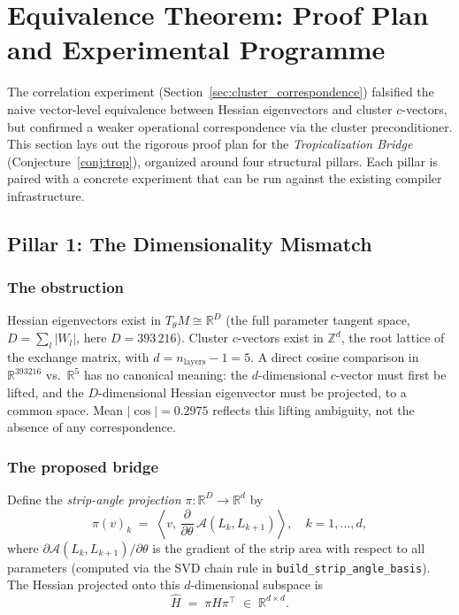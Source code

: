 \documentclass[11pt]{amsart}
\begin{document}
\section{Equivalence Theorem: Proof Plan and Experimental Programme}
\label{sec:equivalence_proof}

The correlation experiment (Section~\ref{sec:cluster_correspondence})
falsified the naive vector-level equivalence between Hessian eigenvectors
and cluster $c$-vectors, but confirmed a weaker operational correspondence
via the cluster preconditioner.
This section lays out the rigorous proof plan for the
\emph{Tropicalization Bridge} (Conjecture~\ref{conj:trop}),
organized around four structural pillars.
Each pillar is paired with a concrete experiment that can be run
against the existing compiler infrastructure.

\subsection{Pillar 1: The Dimensionality Mismatch}
\label{sec:pillar1}

\subsubsection*{The obstruction}

Hessian eigenvectors exist in $T_\theta M \cong \mathbb{R}^D$
(the full parameter tangent space, $D = \sum_l |W_l|$, here $D = 393\,216$).
Cluster $c$-vectors exist in $\mathbb{Z}^d$, the root lattice of the
exchange matrix, with $d = n_\mathrm{layers}-1 = 5$.
A direct cosine comparison in $\mathbb{R}^{393216}$ vs.\ $\mathbb{R}^5$
has no canonical meaning: the $d$-dimensional $c$-vector must first be
lifted, and the $D$-dimensional Hessian eigenvector must be projected,
to a common space.
Mean $|\cos| = 0.2975$ reflects this lifting ambiguity, not the
absence of any correspondence.

\subsubsection*{The proposed bridge}

Define the \emph{strip-angle projection} $\pi: \mathbb{R}^D \to \mathbb{R}^d$ by
\[
  \pi(v)_k \;=\; \left\langle v,\,
    \frac{\partial}{\partial\theta}\,
    \mathcal{A}(L_k, L_{k+1})\right\rangle,
  \quad k = 1,\ldots,d,
\]
where $\partial\mathcal{A}(L_k,L_{k+1})/\partial\theta$ is the
gradient of the strip area with respect to all parameters
(computed via the SVD chain rule in \texttt{build\_strip\_angle\_basis}).
The Hessian projected onto this $d$-dimensional subspace is
\[
  \hat{H} \;=\; \pi H \pi^\top \;\in\; \mathbb{R}^{d\times d}.
\]
\end{document}
